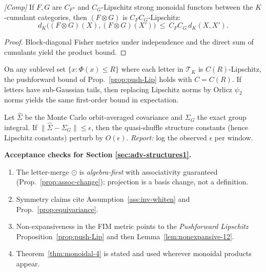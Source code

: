 \begin{theorem}\label{thm:monoidal-4}
\emph{[\textup{Comp}]}
If $F,G$ are $C_F$- and $C_G$-Lipschitz strong monoidal functors between the $K$-cumulant categories, then $(F\otimes G)$ is $C_FC_G$-Lipschitz:
\[
d_K\big((F\otimes G)(X),(F\otimes G)(X')\big)\ \le\ C_FC_G\, d_K(X,X').
\]
\begin{proof}
Block-diagonal Fisher metrics under independence and the direct sum of cumulants yield the product bound.
\end{proof}
\end{theorem}

\begin{proposition}\label{prop:local-orlicz}
On any sublevel set $\{x:\Phi(x)\le R\}$ where each letter in $\mathcal T_K$ is $C(R)$-Lipschitz, 
the pushforward bound of Prop.~\ref{prop:push-Lip} holds with $C\!=\!C(R)$. 
If letters have sub-Gaussian tails, then replacing Lipschitz norms by Orlicz $\psi_2$ norms yields the same first-order bound in expectation.
\end{proposition}

\begin{remark}\label{rem:whiten-error}
Let $\widehat\Sigma$ be the Monte Carlo orbit-averaged covariance and $\Sigma_G$ the exact group integral. If $\|\widehat\Sigma-\Sigma_G\|\le \epsilon$, then the quasi-shuffle structure constants (hence Lipschitz constants) perturb by $O(\epsilon)$. 
\emph{Report:} log the observed $\epsilon$ per window.
\end{remark}

\begin{mdframed}
\textbf{Acceptance checks for Section \ref{sec:adv-structures1}.}
\begin{enumerate}[leftmargin=*]
\item The letter-merge $\odot$ is \emph{algebra-first} with associativity guaranteed (Prop.~\ref{prop:assoc-change}); projection is a basis change, not a definition.
\item Symmetry claims cite Assumption~\ref{ass:inv-whiten} and Prop.~\ref{prop:equivariance}.
\item Non-expansiveness in the FIM metric points to the \emph{Pushforward Lipschitz} Proposition~\ref{prop:push-Lip} and then Lemma~\ref{lem:nonexpansive-12}.
\item Theorem~\ref{thm:monoidal-4} is stated and used wherever monoidal products appear.
\end{enumerate}
\end{mdframed}


